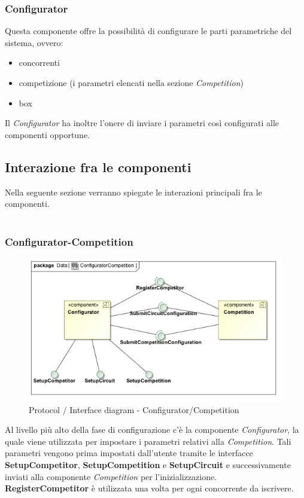 \subsubsection{Configurator}
Questa componente offre la possibilit\`{a} di configurare le parti parametriche del sistema, ovvero:
\begin{itemize}
	\item concorrenti 
	\item competizione (i parametri elencati nella sezione \emph{Competition})
	\item box
\end{itemize}
Il \emph{Configurator} ha inoltre l'onere di inviare i parametri cos\`{i} configurati alle componenti opportune.

\subsection{Interazione fra le componenti}
Nella seguente sezione verranno spiegate le interazioni principali fra le componenti.\\\\
\subsubsection{Configurator-Competition}
\begin{center}
\begin{figure}[h!]
	\includegraphics[scale=0.55]{img/InteractionDiagram/Implementation_Diagram__ConfiguratorCompetition.jpg}
\caption{Protocol / Interface diagram - Configurator/Competition}
\end{figure}
\end{center}
Al livello pi\`{u} alto della fase di configurazione c'\`{e} la componente \emph{Configurator}, la quale viene utilizzata per impostare i parametri
relativi alla \emph{Competition}. Tali parametri vengono prima impostati dall'utente %
tramite le interfacce \textbf{SetupCompetitor},
\textbf{SetupCompetition} e \textbf{SetupCircuit} e successivamente inviati alla componente \emph{Competition} per l'inizializzazione.\\
\textbf{RegisterCompetitor} \`{e} utilizzata una volta per ogni concorrente da iscrivere.
\clearpage
